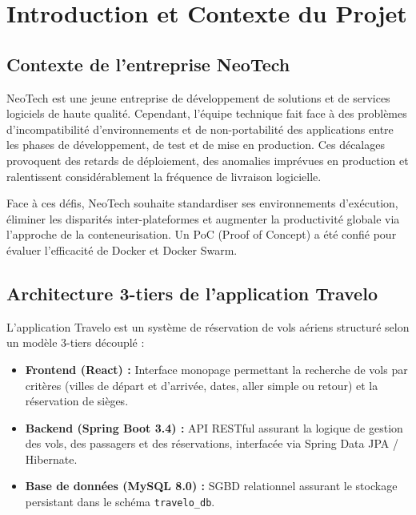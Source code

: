 \documentclass[11pt,a4paper]{article}
\begin{document}
\newpage
\tableofcontents
\newpage

\section{Introduction et Contexte du Projet}

\subsection{Contexte de l'entreprise NeoTech}
NeoTech est une jeune entreprise de développement de solutions et de services logiciels de haute qualité. Cependant, l'équipe technique fait face à des problèmes d'incompatibilité d'environnements et de non-portabilité des applications entre les phases de développement, de test et de mise en production. Ces décalages provoquent des retards de déploiement, des anomalies imprévues en production et ralentissent considérablement la fréquence de livraison logicielle.

Face à ces défis, NeoTech souhaite standardiser ses environnements d'exécution, éliminer les disparités inter-plateformes et augmenter la productivité globale via l'approche de la conteneurisation. Un PoC (Proof of Concept) a été confié pour évaluer l'efficacité de Docker et Docker Swarm.

\subsection{Architecture 3-tiers de l'application Travelo}
L'application Travelo est un système de réservation de vols aériens structuré selon un modèle 3-tiers découplé :
\begin{itemize}
  \item \textbf{Frontend (React) :} Interface monopage permettant la recherche de vols par critères (villes de départ et d'arrivée, dates, aller simple ou retour) et la réservation de sièges.
  \item \textbf{Backend (Spring Boot 3.4) :} API RESTful assurant la logique de gestion des vols, des passagers et des réservations, interfacée via Spring Data JPA / Hibernate.
  \item \textbf{Base de données (MySQL 8.0) :} SGBD relationnel assurant le stockage persistant dans le schéma \texttt{travelo\_db}.
\end{itemize}
\end{document}
